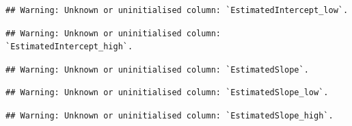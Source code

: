 \documentclass[
]{article}
\begin{document}
\begin{verbatim}
## Warning: Unknown or uninitialised column: `EstimatedIntercept_low`.
\end{verbatim}

\begin{verbatim}
## Warning: Unknown or uninitialised column: `EstimatedIntercept_high`.
\end{verbatim}

\begin{verbatim}
## Warning: Unknown or uninitialised column: `EstimatedSlope`.
\end{verbatim}

\begin{verbatim}
## Warning: Unknown or uninitialised column: `EstimatedSlope_low`.
\end{verbatim}

\begin{verbatim}
## Warning: Unknown or uninitialised column: `EstimatedSlope_high`.
\end{verbatim}
\end{document}
